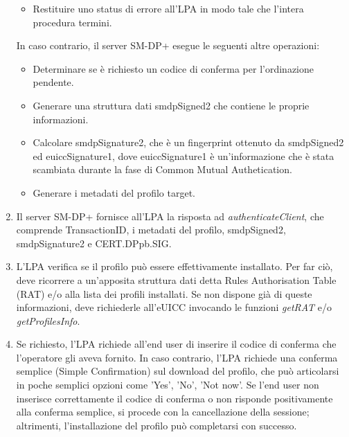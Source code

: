 \documentclass[10pt, twoside, openany]{book}
\begin{document}
\begin{enumerate}
\begin{itemize}[itemsep=0pt]
\item Restituire uno status di errore all'LPA in modo tale che l'intera procedura termini.
\end{itemize}
In caso contrario, il server SM-DP+ esegue le seguenti altre operazioni:
\begin{itemize}[itemsep=0pt]
\item Determinare se è richiesto un codice di conferma per l'ordinazione pendente.
\item Generare una struttura dati smdpSigned2 che contiene le proprie informazioni.
\item Calcolare smdpSignature2, che è un fingerprint ottenuto da smdpSigned2 ed euiccSignature1, dove euiccSignature1 è un'informazione che è stata scambiata durante la fase di Common Mutual Authetication.
\item Generare i metadati del profilo target.
\end{itemize}
\item Il server SM-DP+ fornisce all'LPA la risposta ad \textit{authenticateClient}, che comprende TransactionID, i metadati del profilo, smdpSigned2, smdpSignature2 e CERT.DPpb.SIG.
\item L'LPA verifica se il profilo può essere effettivamente installato. Per far ciò, deve ricorrere a un'apposita struttura dati detta Rules Authorisation Table (RAT) e/o alla lista dei profili installati. Se non dispone già di queste informazioni, deve richiederle all'eUICC invocando le funzioni \textit{getRAT} e/o \textit{getProfilesInfo}.
\item Se richiesto, l'LPA richiede all'end user di inserire il codice di conferma che l'operatore gli aveva fornito. In caso contrario, l'LPA richiede una conferma semplice (Simple Confirmation) sul download del profilo, che può articolarsi in poche semplici opzioni come 'Yes', 'No', 'Not now'. Se l'end user non inserisce correttamente il codice di conferma o non risponde positivamente alla conferma semplice, si procede con la cancellazione della sessione; altrimenti, l'installazione del profilo può completarsi con successo.
\end{enumerate}
\end{document}
